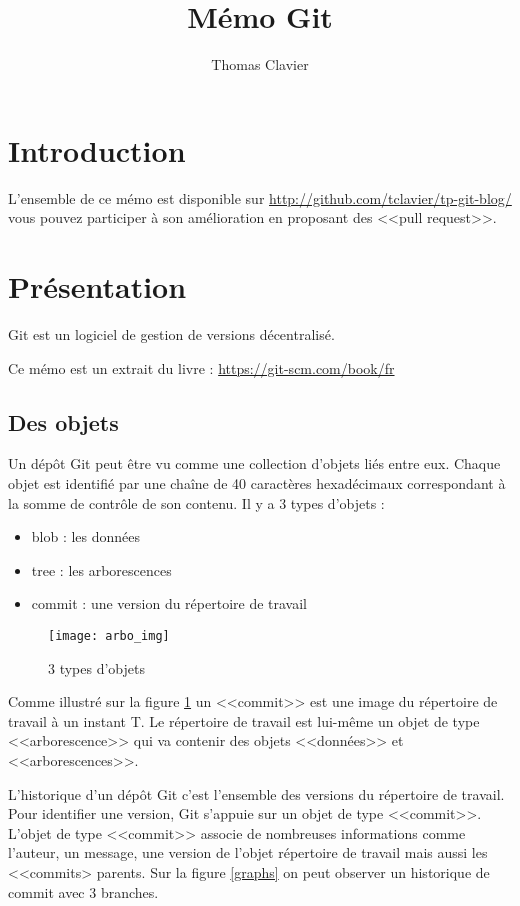 \documentclass[a4paper]{article}
\title{Mémo Git}
\author{Thomas Clavier}
\date{}
\begin{document}
\maketitle

\section*{Introduction}

L'ensemble de ce mémo est disponible sur \url{http://github.com/tclavier/tp-git-blog/} vous pouvez participer à son amélioration en proposant des <<pull request>>.

\section*{Présentation}

Git est un logiciel de gestion de versions décentralisé.

Ce mémo est un extrait du livre : \url{https://git-scm.com/book/fr}

\subsection*{Des objets}
Un dépôt Git peut être vu comme une collection d’objets liés entre eux. 
Chaque objet est identifié par une chaîne de 40 caractères hexadécimaux correspondant à la somme de contrôle de son contenu. 
Il y a 3 types d'objets : 
\begin{itemize}
\item blob : les données
\item tree : les arborescences
\item commit : une version du répertoire de travail
\end{itemize}

\begin{figure}
  \center
  \texttt{[image: arbo\_img]}
  \caption{3 types d'objets}
  \label{objets}
\end{figure}
Comme illustré sur la figure \ref{objets} un <<commit>> est une image du répertoire de travail à un instant T. 
Le répertoire de travail est lui-même un objet de type <<arborescence>> qui va contenir des objets <<données>> et <<arborescences>>.

L'historique d'un dépôt Git c'est l'ensemble des versions du répertoire de travail. Pour identifier une version, Git s'appuie sur un objet de type <<commit>>. 
L'objet de type <<commit>> associe de nombreuses informations comme l'auteur, un message, une version de l'objet répertoire de travail mais aussi les <<commits> parents. 
Sur la figure \ref{graphs} on peut observer un historique de commit avec 3 branches.
\end{document}
